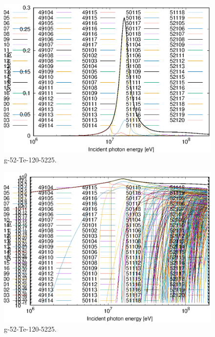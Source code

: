 \begin{figure}
 \includegraphics[width=\linewidth]{eps/g_52-Te-120_5225.eps}
  \caption{g-52-Te-120-5225.}
\end{figure}
\begin{figure}
 \includegraphics[width=\linewidth]{eps-log/g_52-Te-120_5225.eps}
 \caption{g-52-Te-120-5225.}
\end{figure}
\newpage \clearpage

